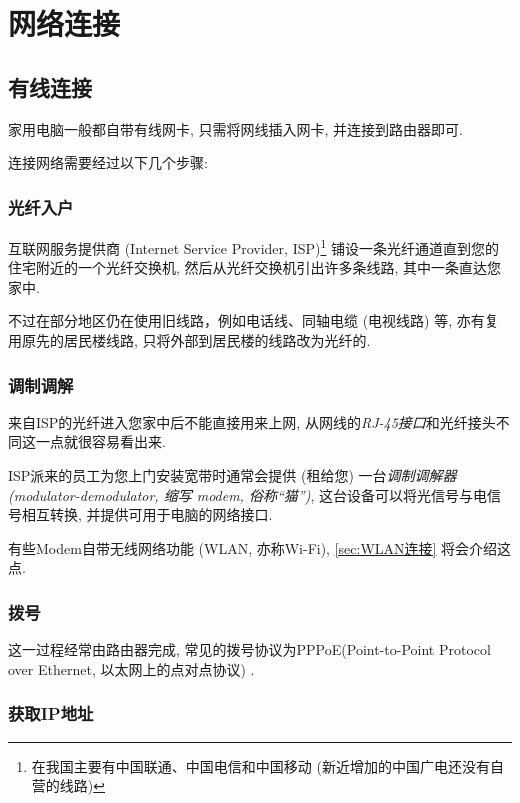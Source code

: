 \chapter{网络连接}

\section{有线连接}

家用电脑一般都自带有线网卡, 只需将网线插入网卡, 并连接到路由器即可. 

连接网络需要经过以下几个步骤:

\subsection{光纤入户}

互联网服务提供商 (Internet Service Provider, ISP)\footnote{在我国主要有中国联通、中国电信和中国移动 (新近增加的中国广电还没有自营的线路)} 铺设一条光纤通道直到您的住宅附近的一个光纤交换机, 然后从光纤交换机引出许多条线路, 其中一条直达您家中.

不过在部分地区仍在使用旧线路，例如电话线、同轴电缆 (电视线路) 等, 亦有复用原先的居民楼线路, 只将外部到居民楼的线路改为光纤的.

\subsection{调制调解}

来自ISP的光纤进入您家中后不能直接用来上网, 从网线的\textit{RJ-45接口}和光纤接头不同这一点就很容易看出来.

ISP派来的员工为您上门安装宽带时通常会提供 (租给您) 一台\textit{调制调解器 (modulator-demodulator, 缩写 modem, 俗称``猫'')}, 这台设备可以将光信号与电信号相互转换, 并提供可用于电脑的网络接口.

有些Modem自带无线网络功能 (WLAN, 亦称Wi-Fi), \autoref*{sec:WLAN连接} 将会介绍这点.



\subsection{拨号}

这一过程经常由路由器完成, 常见的拨号协议为PPPoE(Point-to-Point Protocol over Ethernet, 以太网上的点对点协议) .



\subsection{获取IP地址}


